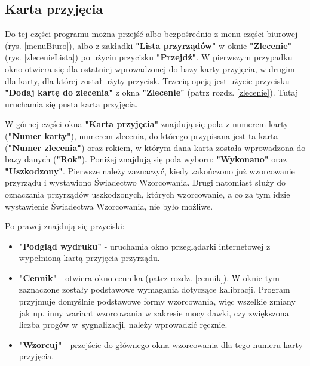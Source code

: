 \subsection{Karta przyjęcia}
\label{karta_przyjecia}

Do tej części programu można przejść albo bezpośrednio z menu części biurowej (rys. \ref{menuBiuro}), albo z zakładki \textbf{"Lista przyrządów"} w oknie \textbf{"Zlecenie"} (rys. \ref{zlecenieLista}) po użyciu przycisku \textbf{"Przejdź"}. W pierwszym przypadku okno otwiera się dla ostatniej wprowadzonej do bazy karty przyjęcia, w drugim dla karty, dla której został użyty przycisk. Trzecią opcją jest użycie przycisku \textbf{"Dodaj kartę do zlecenia"} z okna \textbf{"Zlecenie"} (patrz rozdz. \ref{zlecenie}). Tutaj uruchamia się pusta karta przyjęcia.

W górnej części okna \textbf{"Karta przyjęcia"} znajdują się pola z numerem karty (\textbf{"Numer karty"}), numerem zlecenia, do którego przypisana jest ta karta (\textbf{"Numer zlecenia"}) oraz rokiem, w którym dana karta została wprowadzona do bazy danych (\textbf{"Rok"}).
Poniżej znajdują się pola wyboru: \textbf{"Wykonano"} oraz \textbf{"Uszkodzony"}. Pierwsze należy zaznaczyć, kiedy zakończono już wzorcowanie przyrządu i wystawiono Świadectwo Wzorcowania. Drugi natomiast służy do oznaczania przyrządów uszkodzonych, których wzorcowanie, a co za tym idzie wystawienie Świadectwa Wzorcowania, nie było możliwe.

Po prawej znajdują się przyciski:
\begin{itemize}
	\item \textbf{"Podgląd wydruku"} - uruchamia okno przeglądarki internetowej z wypełnioną kartą przyjęcia przyrządu.
	\item \textbf{"Cennik"} - otwiera okno cennika (patrz rozdz. \ref{cennik}). W oknie tym zaznaczone zostały podstawowe wymagania dotyczące kalibracji. Program przyjmuje domyślnie podstawowe formy wzorcowania, więc wszelkie zmiany jak np. inny wariant wzorcowania w zakresie mocy dawki, czy zwiększona liczba progów w~sygnalizacji, należy wprowadzić ręcznie.
	\item \textbf{"Wzorcuj"} - przejście do głównego okna wzorcowania dla tego numeru karty przyjęcia.
\end{itemize}

